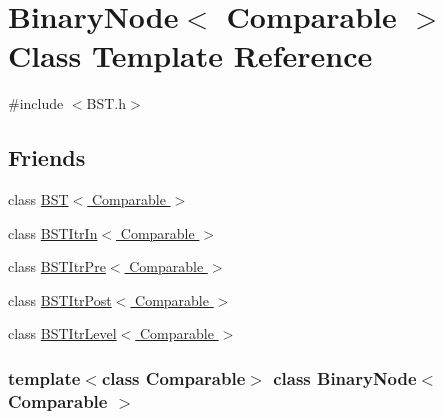 \hypertarget{class_binary_node}{
\section{BinaryNode$<$ Comparable $>$ Class Template Reference}
\label{class_binary_node}
}


{\ttfamily \#include $<$BST.h$>$}

\subsection*{Friends}
\begin{DoxyCompactItemize}
\item 
class \hyperlink{class_binary_node_a28a1adb9906f3ff7e12c2cb6fa2bd54e}{BST$<$ Comparable $>$}
\item 
class \hyperlink{class_binary_node_aab3993acac2ab24a0b59edb0c3acc775}{BSTItrIn$<$ Comparable $>$}
\item 
class \hyperlink{class_binary_node_a45a55df6f11541416d4ea7684c575c1a}{BSTItrPre$<$ Comparable $>$}
\item 
class \hyperlink{class_binary_node_a5dc153694be266f6e772659486219da7}{BSTItrPost$<$ Comparable $>$}
\item 
class \hyperlink{class_binary_node_a26ff00bc0d87069aed877f10fd3c80a8}{BSTItrLevel$<$ Comparable $>$}
\end{DoxyCompactItemize}
\subsubsection*{template$<$class Comparable$>$ class BinaryNode$<$ Comparable $>$}




